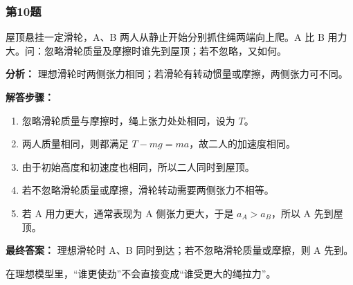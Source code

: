 \documentclass[12pt,a4paper]{ctexart}
\begin{document}
\subsubsection*{第10题}
\begin{tcolorbox}[colback=gray!2!white,colframe=black!60,title={题目}]
屋顶悬挂一定滑轮，A、B 两人从静止开始分别抓住绳两端向上爬。A 比 B 用力大。问：忽略滑轮质量及摩擦时谁先到屋顶；若不忽略，又如何。\par
\end{tcolorbox}
\begin{tcolorbox}[colback=blue!2!white,colframe=blue!55!black,title={完整答案}]
\textbf{分析：}
理想滑轮时两侧张力相同；若滑轮有转动惯量或摩擦，两侧张力可不同。\par
\textbf{解答步骤：}
\begin{enumerate}
\item 忽略滑轮质量与摩擦时，绳上张力处处相同，设为 \(T\)。
\item 两人质量相同，则都满足 \(T-mg=ma\)，故二人的加速度相同。
\item 由于初始高度和初速度也相同，所以二人同时到屋顶。
\item 若不忽略滑轮质量或摩擦，滑轮转动需要两侧张力不相等。
\item 若 A 用力更大，通常表现为 A 侧张力更大，于是 \(a_A>a_B\)，所以 A 先到屋顶。
\end{enumerate}
\textbf{最终答案：}
理想滑轮时 A、B 同时到达；若不忽略滑轮质量或摩擦，则 A 先到。\par
\end{tcolorbox}
\begin{tcolorbox}[colback=red!2!white,colframe=red!55!black,title={易错点}]
在理想模型里，“谁更使劲”不会直接变成“谁受更大的绳拉力”。\par
\end{tcolorbox}
\end{document}

